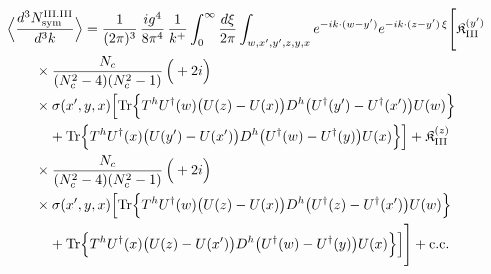\begin{align}\label{eq:S-III.III-3}
&\Big\langle\frac{d^{3}N^{\rm III.III}_{{\rm sym}}}{d^{3}k}\Big\rangle=\frac{1}{(2\pi)^{3}}\, \frac{ig^{4}}{8\pi^{4}}\, \frac{1}{k^{+}} \int_{0}^{\infty}\frac{d\xi}{2\pi} \int_{w,x',y',z,y,x}e^{-ik\cdot(w-y')}e^{-ik\cdot(z-y')\,\xi}\Bigg[ \mathfrak{K}^{(y')}_{\rm III}\notag\\
&\quad\quad \times \frac{N_{c}}{(N_{c}^{2}-4)(N_{c}^{2}-1)}\, \Big(+2i\Big)\notag\\
&\quad\quad \times \sigma(x',y,x)\Big[{\rm Tr}\Big\{T^{h}U^{\dagger}(w)\big(U(z)-U(x)\big)D^{h}\big(U^{\dagger}(y')-U^{\dagger}(x')\big)U(w)\Big\}\notag\\
&\quad\quad\quad +{\rm Tr}\Big\{T^{h}U^{\dagger}(x)\big(U(y')-U(x')\big)D^{h}\big(U^{\dagger}(w)-U^{\dagger}(y)\big)U(x)\Big\}\Big] + \mathfrak{K}^{(z)}_{\rm III}\notag\\
&\quad\quad \times \frac{N_{c}}{(N_{c}^{2}-4)(N_{c}^{2}-1)}\, \Big(+2i\Big)\notag\\
&\quad\quad \times \sigma(x',y,x)\Big[{\rm Tr}\Big\{T^{h}U^{\dagger}(w)\big(U(z)-U(x)\big)D^{h}\big(U^{\dagger}(z)-U^{\dagger}(x')\big)U(w)\Big\}\notag\\
&\quad\quad\quad +{\rm Tr}\Big\{T^{h}U^{\dagger}(x)\big(U(z)-U(x')\big)D^{h}\big(U^{\dagger}(w)-U^{\dagger}(y)\big)U(x)\Big\}\Big]\Bigg] +{\rm c.c.}
\end{align}

